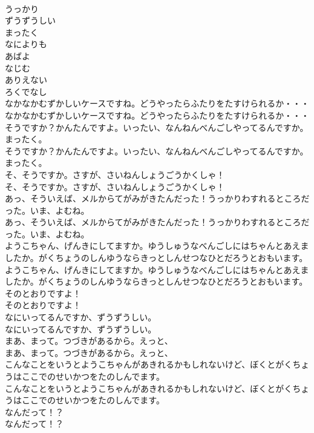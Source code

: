 \documentclass[8pt]{extreport}
\begin{document}
\begin{CJK}{UTF8}{min}
\\	うっかり
\\	ずうずうしい
\\	まったく
\\	なによりも
\\	あばよ
\\	なじむ
\\	ありえない
\\	ろくでなし
\\	なかなかむずかしいケースですね。どうやったらふたりをたすけられるか・・・	
\\	なかなかむずかしいケースですね。どうやったらふたりをたすけられるか・・・ 
\\	そうですか？かんたんですよ。いったい、なんねんべんごしやってるんですか。まったく。	
\\	そうですか？かんたんですよ。いったい、なんねんべんごしやってるんですか。まったく。 
\\	そ、そうですか。さすが、さいねんしょうごうかくしゃ！	
\\	そ、そうですか。さすが、さいねんしょうごうかくしゃ！ 
\\	あっ、そういえば、メルからてがみがきたんだった！うっかりわすれるところだった。いま、よむね。	
\\	あっ、そういえば、メルからてがみがきたんだった！うっかりわすれるところだった。いま、よむね。 
\\	ようこちゃん、げんきにしてますか。ゆうしゅうなべんごしにはちゃんとあえましたか。がくちょうのしんゆうならきっとしんせつなひとだろうとおもいます。	
\\	ようこちゃん、げんきにしてますか。ゆうしゅうなべんごしにはちゃんとあえましたか。がくちょうのしんゆうならきっとしんせつなひとだろうとおもいます。 
\\	そのとおりですよ！	
\\	そのとおりですよ！ 
\\	なにいってるんですか、ずうずうしい。	
\\	なにいってるんですか、ずうずうしい。 
\\	まあ、まって。つづきがあるから。えっと、	
\\	まあ、まって。つづきがあるから。えっと、 
\\	こんなことをいうとようこちゃんがあきれるかもしれないけど、ぼくとがくちょうはここでのせいかつをたのしんでます。	
\\	こんなことをいうとようこちゃんがあきれるかもしれないけど、ぼくとがくちょうはここでのせいかつをたのしんでます。 
\\	なんだって！？	
\\	なんだって！？ 

\end{CJK}
\end{document}
